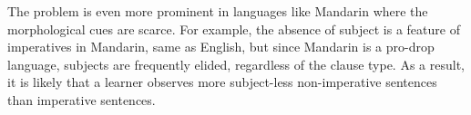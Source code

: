The problem is even more prominent in languages like Mandarin where the morphological cues are scarce. For example, the absence of subject is a feature of imperatives in Mandarin, same as English, but since Mandarin is a pro-drop language, subjects are frequently elided, regardless of the clause type. As a result, it is likely that a learner observes more subject-less non-imperative sentences than imperative sentences.  



